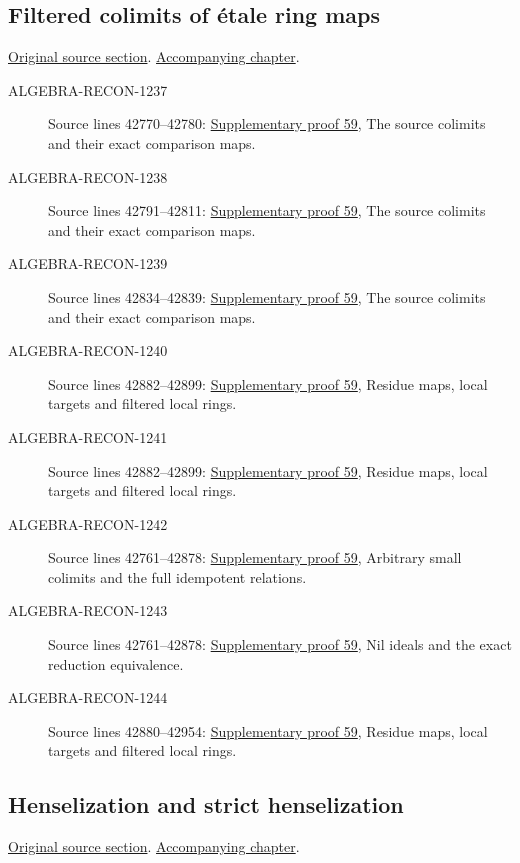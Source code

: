 \subsection{Filtered colimits of \'etale ring maps}
\hypertarget{algebra-source-section-ind-etale}{}
\noindent\href{https://github.com/stacks/stacks-project/blob/a04446e57ec1fbc252a871afcec7752fb2807b14/algebra.tex\#L42761}{Original source section}. \href{algebra.pdf\#nameddest=section-ind-etale}{Accompanying chapter}.

\begin{description}
\item[ALGEBRA-RECON-1237] Source lines 42770--42780: \hyperlink{algebra_indetale_notes_20260929}{Supplementary proof 59}, The source colimits and their exact comparison maps.
\item[ALGEBRA-RECON-1238] Source lines 42791--42811: \hyperlink{algebra_indetale_notes_20260929}{Supplementary proof 59}, The source colimits and their exact comparison maps.
\item[ALGEBRA-RECON-1239] Source lines 42834--42839: \hyperlink{algebra_indetale_notes_20260929}{Supplementary proof 59}, The source colimits and their exact comparison maps.
\item[ALGEBRA-RECON-1240] Source lines 42882--42899: \hyperlink{algebra_indetale_notes_20260929}{Supplementary proof 59}, Residue maps, local targets and filtered local rings.
\item[ALGEBRA-RECON-1241] Source lines 42882--42899: \hyperlink{algebra_indetale_notes_20260929}{Supplementary proof 59}, Residue maps, local targets and filtered local rings.
\item[ALGEBRA-RECON-1242] Source lines 42761--42878: \hyperlink{algebra_indetale_notes_20260929}{Supplementary proof 59}, Arbitrary small colimits and the full idempotent relations.
\item[ALGEBRA-RECON-1243] Source lines 42761--42878: \hyperlink{algebra_indetale_notes_20260929}{Supplementary proof 59}, Nil ideals and the exact reduction equivalence.
\item[ALGEBRA-RECON-1244] Source lines 42880--42954: \hyperlink{algebra_indetale_notes_20260929}{Supplementary proof 59}, Residue maps, local targets and filtered local rings.
\end{description}

\subsection{Henselization and strict henselization}
\hypertarget{algebra-source-section-henselization}{}
\noindent\href{https://github.com/stacks/stacks-project/blob/a04446e57ec1fbc252a871afcec7752fb2807b14/algebra.tex\#L42959}{Original source section}. \href{algebra.pdf\#nameddest=section-henselization}{Accompanying chapter}.

